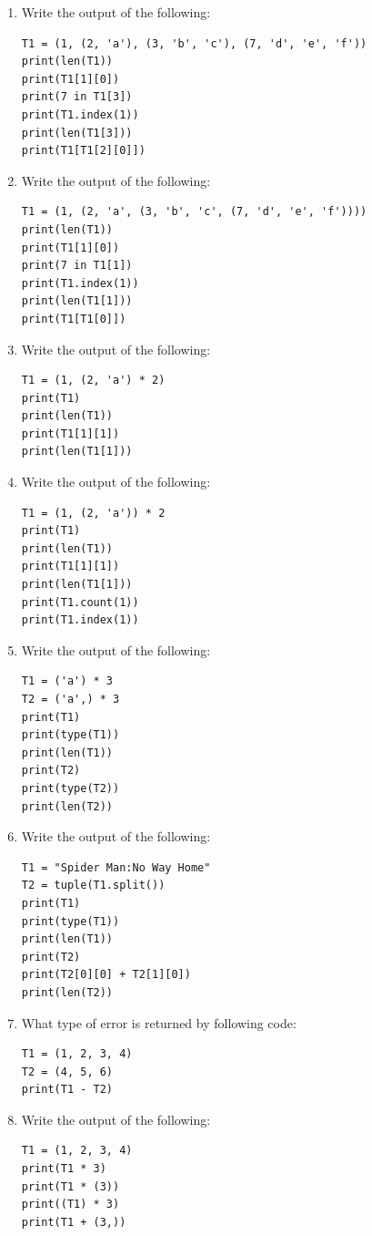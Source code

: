 \documentclass[11pt,a4paper]{article}
\begin{document}
\begin{enumerate}[label=\textbf{Q\arabic*.}]
\item Write the output of the following:
\begin{lstlisting}
T1 = (1, (2, 'a'), (3, 'b', 'c'), (7, 'd', 'e', 'f'))
print(len(T1))
print(T1[1][0])
print(7 in T1[3])
print(T1.index(1))
print(len(T1[3]))
print(T1[T1[2][0]])
\end{lstlisting}

\item Write the output of the following:
\begin{lstlisting}
T1 = (1, (2, 'a', (3, 'b', 'c', (7, 'd', 'e', 'f'))))
print(len(T1))
print(T1[1][0])
print(7 in T1[1])
print(T1.index(1))
print(len(T1[1]))
print(T1[T1[0]])
\end{lstlisting}

\item Write the output of the following:
\begin{lstlisting}
T1 = (1, (2, 'a') * 2)
print(T1)
print(len(T1))
print(T1[1][1])
print(len(T1[1]))
\end{lstlisting}

\item Write the output of the following:
\begin{lstlisting}
T1 = (1, (2, 'a')) * 2
print(T1)
print(len(T1))
print(T1[1][1])
print(len(T1[1]))
print(T1.count(1))
print(T1.index(1))
\end{lstlisting}

\item Write the output of the following:
\begin{lstlisting}
T1 = ('a') * 3
T2 = ('a',) * 3
print(T1)
print(type(T1))
print(len(T1))
print(T2)
print(type(T2))
print(len(T2))
\end{lstlisting}

\item Write the output of the following:
\begin{lstlisting}
T1 = "Spider Man:No Way Home"
T2 = tuple(T1.split())
print(T1)
print(type(T1))
print(len(T1))
print(T2)
print(T2[0][0] + T2[1][0])
print(len(T2))
\end{lstlisting}

\item What type of error is returned by following code:
\begin{lstlisting}
T1 = (1, 2, 3, 4)
T2 = (4, 5, 6)
print(T1 - T2)
\end{lstlisting}

\item Write the output of the following:
\begin{lstlisting}
T1 = (1, 2, 3, 4)
print(T1 * 3)
print(T1 * (3))
print((T1) * 3)
print(T1 + (3,))
\end{lstlisting}


\end{enumerate}
\end{document}
